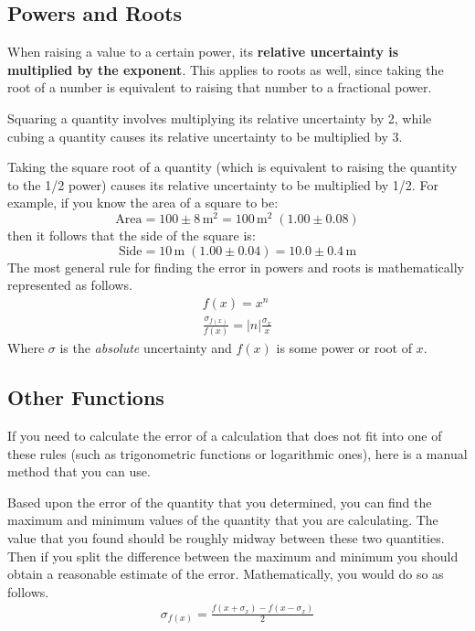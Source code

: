 \documentclass[letterpaper, 12pt]{book}
\newcommand{\myskip}{\vspace{0.5\baselineskip}}
\begin{document}
\subsection{Powers and Roots}

When raising a value to a certain power, its \textbf{relative uncertainty is multiplied by the exponent}. This applies to roots as well, since taking the root of a number is equivalent to raising that number to a fractional power.\myskip

Squaring a quantity involves multiplying its relative uncertainty by 2, while cubing a quantity causes its relative uncertainty to be multiplied by 3.\myskip

Taking the square root of a quantity (which is equivalent to raising the quantity to the 1/2 power) causes its relative uncertainty to be multiplied by 1/2. For example, if you know the area of a square to be:
\begin{equation}
    \text{Area} = 100\pm 8\,\mathrm{m^2} = 100\,\mathrm{m}^2\;(1.00\pm 0.08)
\end{equation}
then it follows that the side of the square is:
\begin{equation}
    \text{Side} = 10\,\mathrm{m}\;\left( 1.00\pm 0.04 \right) = 10.0\pm 0.4\,\mathrm{m}
\end{equation}
The most general rule for finding the error in powers and roots is mathematically represented as follows.
\begin{gather}
f(x) = x^n \\
\frac{\sigma_{f(x)}}{f(x)} = |n| \frac{\sigma_x}{x}
\end{gather}
Where $\sigma$ is the {\it{absolute}} uncertainty and $f(x)$ is some power or root of $x$.

\subsection{Other Functions}

If you need to calculate the error of a calculation that does not fit into one of these rules (such as trigonometric functions or logarithmic ones), here is a manual method that you can use.\myskip

Based upon the error of the quantity that you determined, you can find the maximum and minimum values of the quantity that you are calculating. The value that you found should be roughly midway between these two quantities. Then if you split the difference between the maximum and minimum you should obtain a reasonable estimate of the error. Mathematically, you would do so as follows.
\begin{gather}
\sigma_{f(x)} = \frac{f(x + \sigma_x) - f(x - \sigma_x)}{2}
\end{gather}
\end{document}
